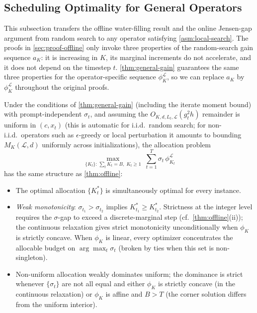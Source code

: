\subsection{Scheduling Optimality for General Operators}
\label{sec:general-scheduling}
%
This subsection transfers the offline water-filling result and the online Jensen-gap argument from random search to any operator satisfying \cref{asm:local-search}. The proofs in \cref{sec:proof-offline} only invoke three properties of the random-search gain sequence $a_K$: it is increasing in $K$, its marginal increments do not accelerate, and it does not depend on the timestep $t$. \cref{thm:general-gain} guarantees the same three properties for the operator-specific sequence $\phi_K^{\mathcal{L}}$, so we can replace $a_K$ by $\phi_K^{\mathcal{L}}$ throughout the original proofs.
%
\begin{corollary}
\label{cor:offline-general}
Under the conditions of \cref{thm:general-gain} (including the iterate moment bound) with prompt-independent $\sigma_t$, and assuming the $O_{K,d,L_t,\mathcal{L}}(g_t^2 h)$ remainder is uniform in $(c, x_t)$ (this is automatic for i.i.d.\ random search; for non-i.i.d.\ operators such as $\epsilon$-greedy or local perturbation it amounts to bounding $M_K(\mathcal{L}, d)$ uniformly across initializations), the allocation problem
\begin{equation}
  \max_{\{K_t\}:\,\sum_t K_t = B,\;K_t \ge 1}\;\sum_{t=1}^{T} \sigma_t\,\phi_{K_t}^{\mathcal{L}}
  \label{eq:alloc-general}
\end{equation}
has the same structure as \cref{thm:offline}:
\begin{itemize}
\item[\textup{(i)}] The optimal allocation $\{K_t^*\}$ is simultaneously optimal for every instance.
\item[\textup{(ii)}] \emph{Weak monotonicity}: $\sigma_{t_1} > \sigma_{t_2}$ implies $K_{t_1}^* \ge K_{t_2}^*$. Strictness at the integer level requires the $\sigma$-gap to exceed a discrete-marginal step (cf.\ \cref{thm:offline}\textup{(ii)}); the continuous relaxation gives strict monotonicity unconditionally when $\phi_K$ is strictly concave. When $\phi_K$ is linear, every optimizer concentrates the allocable budget on $\arg\max_t \sigma_t$ (broken by ties when this set is non-singleton).
\item[\textup{(iii)}] Non-uniform allocation weakly dominates uniform; the dominance is strict whenever $\{\sigma_t\}$ are not all equal and either $\phi_K$ is strictly concave (in the continuous relaxation) or $\phi_K$ is affine and $B > T$ (the corner solution differs from the uniform interior).
\end{itemize}
\end{corollary}
